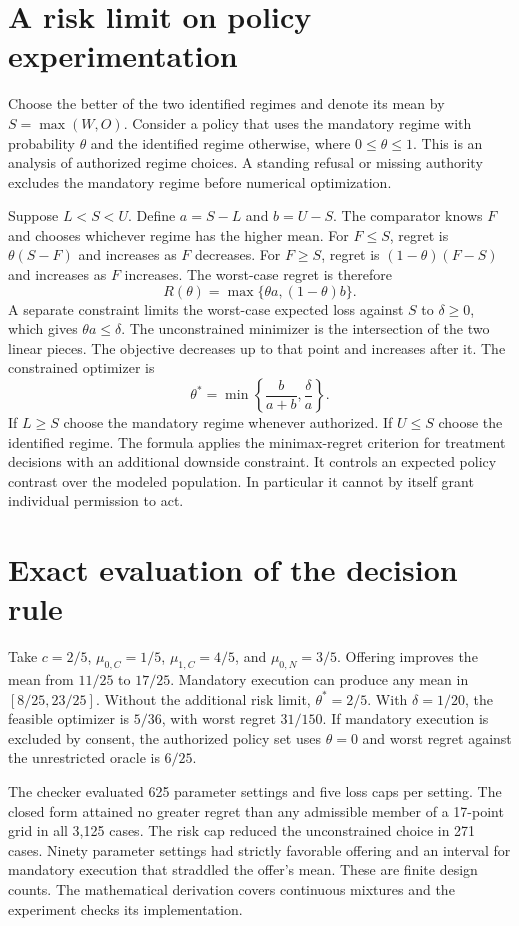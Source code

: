 \documentclass[11pt]{article}
\begin{document}
\section{A risk limit on policy experimentation}
Choose the better of the two identified regimes and denote its mean
by $S=\max(W,O)$. Consider a policy that uses the mandatory regime
with probability $\theta$ and the identified regime otherwise,
where $0\le\theta\le1$. This is an analysis of authorized regime
choices. A standing refusal or missing authority excludes the
mandatory regime before numerical optimization.

Suppose $L<S<U$. Define $a=S-L$ and $b=U-S$. The comparator
knows $F$ and chooses whichever regime has the higher mean.
For $F\le S$, regret is $\theta(S-F)$ and increases as $F$
decreases. For $F\ge S$, regret is $(1-\theta)(F-S)$ and
increases as $F$ increases. The worst-case regret is therefore
\[
R(\theta)=\max\{\theta a,(1-\theta)b\}.
\]
A separate constraint limits the worst-case expected loss against
$S$ to $\delta\ge0$, which gives $\theta a\le\delta$.
The unconstrained minimizer is the intersection of the two linear
pieces. The objective decreases up to that point and increases
after it. The constrained optimizer is
\[
\theta^*=\min\!\left\{\frac{b}{a+b},\frac{\delta}{a}\right\}.
\]
If $L\ge S$ choose the mandatory regime whenever authorized.
If $U\le S$ choose the identified regime. The formula applies the
minimax-regret criterion for treatment decisions \cite{manski}
with an additional downside constraint. It controls an expected
policy contrast over the modeled population. In particular it
cannot by itself grant individual permission to act.

\section{Exact evaluation of the decision rule}
Take $c=2/5$, $\mu_{0,C}=1/5$, $\mu_{1,C}=4/5$, and
$\mu_{0,N}=3/5$. Offering improves the mean from $11/25$ to
$17/25$. Mandatory execution can produce any mean in $[8/25,23/25]$.
Without the additional risk limit, $\theta^*=2/5$. With
$\delta=1/20$, the feasible optimizer is $5/36$, with worst
regret $31/150$. If mandatory execution is excluded by consent,
the authorized policy set uses $\theta=0$ and worst regret
against the unrestricted oracle is $6/25$.

The checker evaluated 625 parameter settings and five loss caps
per setting. The closed form attained no greater regret than any
admissible member of a 17-point grid in all 3,125 cases.
The risk cap reduced the unconstrained choice in 271 cases.
Ninety parameter settings had strictly favorable offering and
an interval for mandatory execution that straddled the offer's
mean. These are finite design counts. The mathematical derivation
covers continuous mixtures and the experiment checks its implementation.
\end{document}
